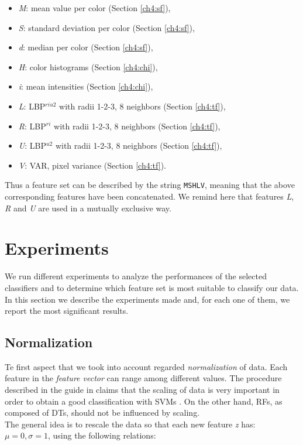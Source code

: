 \begin{itemize}
 \item \textit{M}: mean value per color (Section \ref{ch4:sf}),
 \item \textit{S}: standard deviation per color (Section \ref{ch4:sf}),
 \item \textit{d}: median per color (Section \ref{ch4:sf}),
 \item \textit{H}: color histograms (Section \ref{ch4:chi}),
 \item \textit{i}: mean intensities (Section \ref{ch4:chi}),
 \item \textit{L}: LBP$^{riu2}$ with radii 1-2-3, 8 neighbors (Section \ref{ch4:tf}),
 \item \textit{R}: LBP$^{ri}$ with radii 1-2-3, 8 neighbors (Section \ref{ch4:tf}),
 \item \textit{U}: LBP$^{u2}$ with radii 1-2-3, 8 neighbors (Section \ref{ch4:tf}),
 \item \textit{V}: VAR, pixel variance (Section \ref{ch4:tf}).
\end{itemize}

\noindent Thus a feature set can be described by the string \texttt{MSHLV}, meaning that the above corresponding features have been concatenated.
We remind here that features \textit{L}, \textit{R} and \textit{U} are used in a mutually exclusive way. 

\vspace{0.5cm}

\section{Experiments}


We run different experiments to analyze the performances of the selected classifiers and to determine which feature set is most suitable to classify our data.
In this section we describe the experiments made and, for each one of them, we report the most significant results.

\vspace{0.5cm}

\subsection{Normalization}

Te first aspect that we took into account regarded \textit{normalization} of data. Each feature in the \textit{feature vector} can range among different values.
The procedure described in the guide in \cite{SVM01} claims that the scaling of data is very important in order to obtain a good classification with \Glspl{SVM} \cite{juszczak2002feature}.
On the other hand, \Glspl{RF}, as composed of \Glspl{DT}, should not be influenced by scaling.\\
The general idea is to rescale the data so that each new feature \textit{z} has: $\mu = 0, \sigma = 1$, using the following relations:

